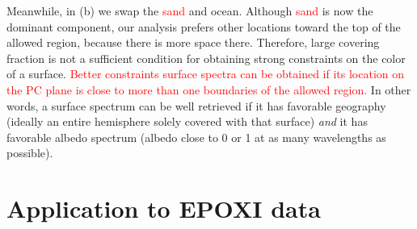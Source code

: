 \documentclass[iop,numberedappendix,apj]{emulateapj}
\def\edit#1{\textcolor{red}{#1}}
\begin{document}
Meanwhile, in (b) we swap the \edit{sand} and ocean.  
Although \edit{sand} is now the dominant component, 
our analysis prefers other locations toward the top of the allowed region, because there is more space there. 
Therefore, large covering fraction is not a sufficient condition for obtaining strong constraints on the color of a surface. 
\edit{Better constraints surface spectra can be obtained if its location on the PC plane is close to more than one boundaries of the allowed region. }
In other words, a surface spectrum can be well retrieved if it has favorable geography (ideally an entire hemisphere solely covered with that surface) {\it and} it has favorable albedo spectrum (albedo close to 0 or 1 at as many wavelengths as possible). 



\section{Application to EPOXI data}
\label{s:EPOXI}
\end{document}
